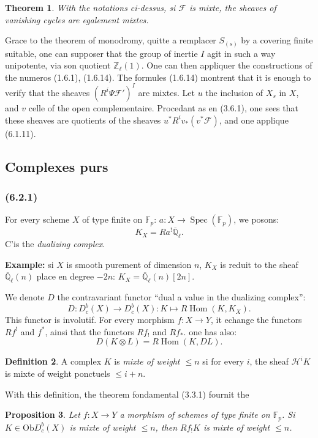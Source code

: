 \documentclass[12pt,a4paper]{article}
\theoremstyle{plain}
\newtheorem{theorem}{Theorem}[section]
\newtheorem{proposition}[theorem]{Proposition}
\theoremstyle{definition}
\newtheorem{definition}[theorem]{Definition}
\theoremstyle{remark}
\newcommand{\Ob}{\mathrm{Ob}}
\DeclareMathOperator{\Hom}{Hom}
\DeclareMathOperator{\Spec}{Spec}
\newcommand{\scrF}{\mathscr{F}}
\newcommand{\scrH}{\mathscr{H}}
\newcommand{\Zl}{\mathbb{Z}_\ell}
\newcommand{\Qlb}{\overline{\mathbb{Q}}_\ell}
\newcommand{\Fp}{\mathbb{F}_p}
\begin{document}
\begin{theorem}
With the notations ci-dessus, si $\scrF$ is mixte, the sheaves of vanishing cycles are egalement mixtes.
\end{theorem}

Grace to the theorem of monodromy, quitte a remplacer $S_{(s)}$ by a covering finite suitable, one can supposer that the group of inertie $I$ agit in such a way unipotente, via son quotient $\Zl(1)$. One can then appliquer the constructions of the numeros (1.6.1), (1.6.14). The formules (1.6.14) montrent that it is enough to verify that the sheaves $(R^i \Psi \scrF')^I$ are mixtes. Let $u$ the inclusion of $X_s$ in $X$, and $v$ celle of the open complementaire. Procedant as en (3.6.1), one sees that these sheaves are quotients of the sheaves $u^* R^i v_*(v^* \scrF)$, and one applique (6.1.11).

\subsection{Complexes purs}

\subsubsection*{\textup{(6.2.1)}}

For every scheme $X$ of type finite on $\Fp$: $a : X \to \Spec(\Fp)$, we posons:
\[
K_X = Ra^! \Qlb.
\]
C'is the \emph{dualizing complex}.

\textbf{Example:} si $X$ is smooth purement of dimension $n$, $K_X$ is reduit to the sheaf $\Qlb(n)$ place en degree $-2n$: $K_X = \Qlb(n)[2n]$.

We denote $D$ the contravariant functor ``dual a value in the dualizing complex'':
\[
D : D_c^b(X) \to D_c^b(X) : K \mapsto R\Hom(K, K_X).
\]
This functor is involutif. For every morphism $f : X \to Y$, it echange the functors $Rf^!$ and $f^*$, ainsi that the functors $Rf_!$ and $Rf_*$. one has also:
\[
D(K \otimes L) = R\Hom(K, DL).
\]

\begin{definition}
A complex $K$ is \emph{mixte of weight $\leq n$} si for every $i$, the sheaf $\scrH^i K$ is mixte of weight ponctuels $\leq i + n$.
\end{definition}

With this definition, the theorem fondamental (3.3.1) fournit the

\begin{proposition}
Let $f : X \to Y$ a morphism of schemes of type finite on $\Fp$. Si $K \in \Ob D_c^b(X)$ is mixte of weight $\leq n$, then $Rf_! K$ is mixte of weight $\leq n$.
\end{proposition}
\end{document}
